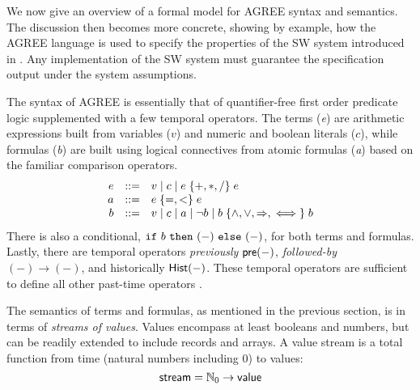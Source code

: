 \begin{comment}
This section gives an abstract mathematical overview of AGREE's
compositional reasoning system, defining assume-guarantee contracts
and the verification conditions that AGREE checks in order to
modularly establish overall system correctness at the model level.
The syntax and semantics of AGREE are sketched in some detail.  The
discussion then becomes more concrete, showing---by example---how the
AGREE contract language is used to specify the cyber-hardened system
of \figref{fig:hardened}. The discussion proceeds from the
system-level contract to the filter and monitor components, which rely
on the notion of a \emph{code contract} to support code generation.
\end{comment}


We now give an overview of a formal model for AGREE syntax and semantics.
The discussion then becomes more concrete, showing by example, how the AGREE language is used to specify the properties of the SW system introduced in .
Any implementation of the SW system must guarantee the specification output under the system assumptions.

The syntax of AGREE is
essentially that of quantifier-free first order predicate logic
supplemented with a few temporal operators. The terms (\emph{e}) are
arithmetic expressions built from variables ($v$) and numeric and
boolean literals ($c$), while formulas (\emph{b}) are built using
logical connectives from atomic formulas (\emph{a}) based on the
familiar comparison operators.
\[
\begin{array}{rcl}
e & ::= & v \mid c \mid e \;\{ {+,*,/} \}\; e \\
a & ::= & e\; \{ {=,<} \}\; e \\
b & ::= & v \mid c \mid a \mid \neg b
            \mid b \; \{ {\land,\lor,\Rightarrow,\iff} \}\; b
\end{array}
\]
There is also a conditional, $\mbox{$\mathtt{if}\ {b}\ \mathtt{then}\ {(-)}\ \mathtt{else}\ {(-)}$}$, for both terms
and formulas. Lastly, there are temporal operators \emph{previously} $\mathsf{pre}(-)$,
\emph{followed-by} $(-) \to (-)$, and historically $\mathsf{Hist}(-)$.
These temporal operators are sufficient to define all other past-time operators \cite{monitor}.

The semantics of terms and formulas, as mentioned in the previous section, is in terms of \emph{streams of
values}. Values encompass at least booleans and numbers, but can be
readily extended to include records and arrays. A value stream is a
total function from time (natural numbers including 0) to values:
\[
 \mathsf{stream} = \mathbb{N}_0 \to \mathsf{value}
\]

